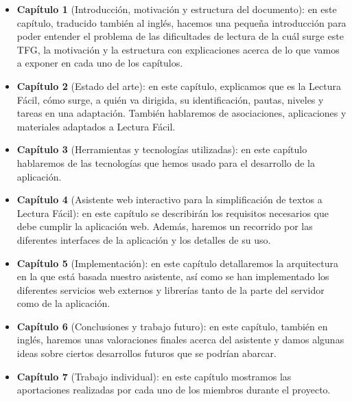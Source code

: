 \begin{itemize}
	\item {\textbf{Capítulo 1}} (Introducción, motivación y estructura del documento): en este capítulo, traducido también al inglés, hacemos una pequeña introducción para poder entender el problema de las dificultades de lectura de la cuál surge este TFG, la motivación y la estructura con explicaciones acerca de lo que vamos a exponer en cada uno de los capítulos.
	
 \setlength{\parskip}{10pt}
	
	\item{\textbf{Capítulo 2}} (Estado del arte): en este capítulo, explicamos que es la Lectura Fácil, cómo surge, a quién va dirigida, su identificación, pautas, niveles y tareas en una adaptación. También hablaremos de asociaciones, aplicaciones y materiales adaptados a Lectura Fácil. 

 \setlength{\parskip}{10pt}

\item{\textbf{Capítulo 3}} (Herramientas y tecnologías utilizadas): en este capítulo hablaremos de las tecnologías que hemos usado para el desarrollo de la aplicación.
 \setlength{\parskip}{10pt}

\item{\textbf{Capítulo 4}} (Asistente web interactivo para la simplificación de textos a Lectura Fácil): en este capítulo se describirán los requisitos necesarios que debe cumplir la aplicación web. Además, haremos un recorrido por las diferentes interfaces de la aplicación y los detalles de su uso. 

\item{\textbf{Capítulo 5}} (Implementación): en este capítulo detallaremos la arquitectura en la que está basada nuestro asistente, así como se han implementado los diferentes servicios web externos y librerías tanto de la parte del servidor como de la aplicación. 
\item{\textbf{Capítulo 6}} (Conclusiones y trabajo futuro): en este capítulo, también en inglés,  haremos unas valoraciones finales acerca del asistente y damos algunas ideas sobre ciertos desarrollos futuros que se podrían abarcar.

\item{\textbf{Capítulo 7}} (Trabajo individual): en este capítulo mostramos las aportaciones realizadas por cada uno de los miembros durante el proyecto.



\end{itemize}

